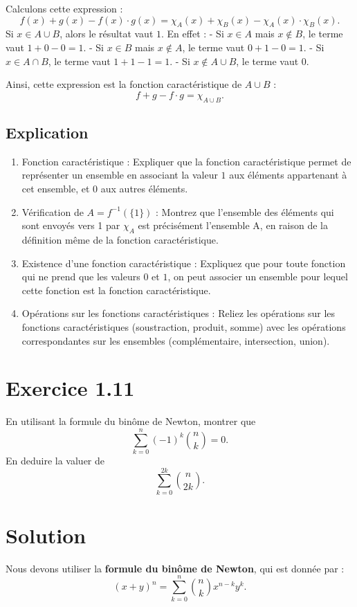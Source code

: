 \documentclass[a4paper,oneside,12pt]{amsbook}
\theoremstyle{definition}
\theoremstyle{remark}
\begin{document}
Calculons cette expression :
\[
f(x) + g(x) - f(x) \cdot g(x) = \chi_A(x) + \chi_B(x) - \chi_A(x) \cdot \chi_B(x).
\]
Si $x \in A \cup B$, alors le résultat vaut $1$. En effet :
- Si $x \in A$ mais $x \notin B$, le terme vaut $1 + 0 - 0 = 1$.
- Si $x \in B$ mais $x \notin A$, le terme vaut $0 + 1 - 0 = 1$.
- Si $x \in A \cap B$, le terme vaut $1 + 1 - 1 = 1$.
- Si $x \notin A \cup B$, le terme vaut $0$.

Ainsi, cette expression est la fonction caractéristique de $A \cup B$ :
\[
f + g - f \cdot g = \chi_{A \cup B}.
\]



\subsection*{Explication}
\begin{enumerate}
    \item Fonction caractéristique : Expliquer que la fonction caractéristique permet de représenter un ensemble en associant la valeur $1$ aux éléments appartenant à cet ensemble, et $0$ aux autres éléments.
	\item Vérification de  $A = f^{-1}(\{1\})$  : Montrez que l’ensemble des éléments qui sont envoyés vers 1 par  $\chi_A$  est précisément l’ensemble A, en raison de la définition même de la fonction caractéristique.
    \item Existence d’une fonction caractéristique : Expliquez que pour toute fonction qui ne prend que les valeurs $0$ et $1$, on peut associer un ensemble pour lequel cette fonction est la fonction caractéristique.
	\item Opérations sur les fonctions caractéristiques : Reliez les opérations sur les fonctions caractéristiques (soustraction, produit, somme) avec les opérations correspondantes sur les ensembles (complémentaire, intersection, union).
\end{enumerate}


\section*{Exercice 1.11}
En utilisant la formule du binôme de Newton, montrer que $$\sum_{k=0}^n (-1)^k \binom{n}{k} = 0.$$ En deduire la valuer de $$\sum_{k=0}^{2k} \binom{n}{2k}.$$
\section*{Solution}
Nous devons utiliser la \textbf{formule du binôme de Newton}, qui est donnée par :
\[
(x + y)^n = \sum_{k=0}^n \binom{n}{k} x^{n-k} y^k.
\]
\end{document}
